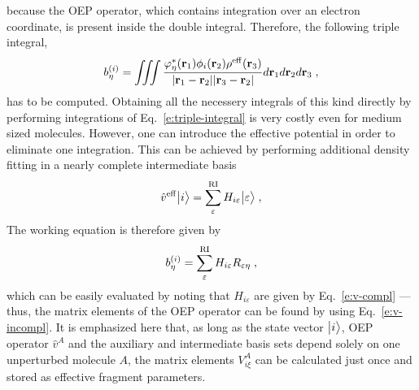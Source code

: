 \documentclass[aip,jcp,amsmath,amssymb,reprint,floatfix]{revtex4-1}
\begin{document}
because the OEP operator, which contains integration over an electron coordinate,
is present inside the double integral. Therefore, the following triple integral,
%
\begin{equation} \label{e:triple-integral}
 b^{(i)}_\eta = \iiint 
           \frac{ \varphi^*_\eta({\bf r}_1) \phi_i({\bf r}_2)  \rho^{\rm eff}({\bf r}_3) }
            {\vert {\bf r}_1 - {\bf r}_2 \vert \vert {\bf r}_3 - {\bf r}_2 \vert}
           d{\bf r}_1 d{\bf r}_2 d{\bf r}_3 \;,
\end{equation}
%
has to be computed.
Obtaining all the necessery integrals of this kind directly 
by performing integrations of Eq.~\eqref{e:triple-integral} is very costly 
even for medium sized molecules.\cite{Barca.Loos.JCP.2017}
However, one can introduce the effective potential in order to eliminate one integration. 
This can be achieved by performing additional density fitting 
in a nearly complete intermediate basis\cite{Barca.Loos.JCP.2017}  %
%
\begin{equation}
 \hat{v}^{\rm eff} \Ket{i} = \sum_\varepsilon^{\rm RI} H_{i\varepsilon} \Ket{\varepsilon} \;,
\end{equation}
%
The working equation is therefore given by
%
\begin{equation} \label{e:v-compl-b-coeff}
 b^{(i)}_\eta = \sum_\varepsilon^{\rm RI} H_{i\varepsilon} R_{\varepsilon\eta} \;,
\end{equation}
%
which can be easily evaluated by noting that
$H_{i\varepsilon}$ are given by Eq.~\eqref{e:v-compl}
--- thus, the matrix elements of the OEP operator can be found
by using Eq.~\eqref{e:v-incompl}.
It is emphasized here that, as long as the state vector $\Ket{i}$, OEP operator $\hat{v}^A$ 
and the auxiliary and intermediate basis sets depend solely on one unperturbed molecule $A$, the matrix elements
$V^A_{i\xi}$ can be calculated just once and stored as effective fragment parameters.
\end{document}
